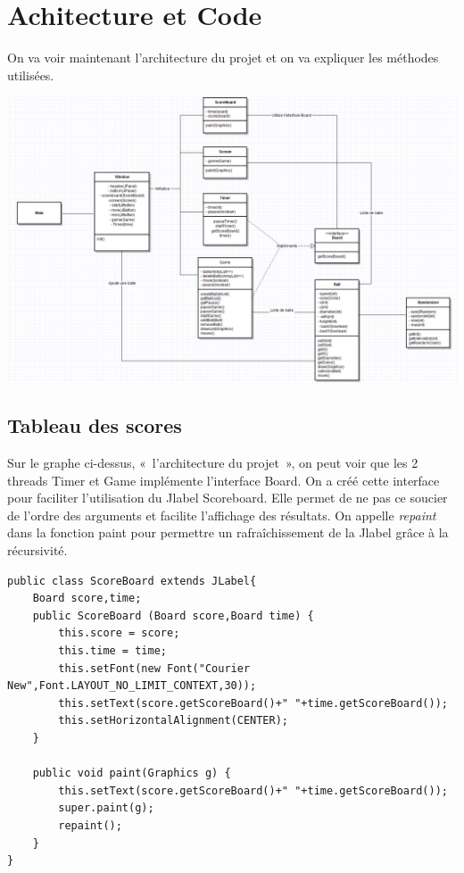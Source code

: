 \documentclass{article}
\begin{document}
\section{Achitecture et Code}
\label{section:hello} %

On va voir maintenant l'architecture du projet et on va expliquer les méthodes utilisées.

\begin{center}
  \includegraphics[scale=0.35]{architecture.png}
\end{center}

\subsection{Tableau des scores}
Sur le graphe ci-dessus, « l’architecture du projet », on peut voir que les 2 threads Timer et Game implémente l’interface Board. On a créé cette interface pour faciliter l’utilisation du Jlabel Scoreboard. Elle permet de ne pas ce soucier de l’ordre des arguments et facilite l’affichage des résultats. On appelle \textit{repaint}~\cite{repaintDoc} dans la fonction paint pour permettre un rafraîchissement de la Jlabel grâce à la récursivité. 
\begin{verbatim}
public class ScoreBoard extends JLabel{
    Board score,time;
    public ScoreBoard (Board score,Board time) {
        this.score = score;
        this.time = time;
        this.setFont(new Font("Courier New",Font.LAYOUT_NO_LIMIT_CONTEXT,30));
        this.setText(score.getScoreBoard()+" "+time.getScoreBoard());
        this.setHorizontalAlignment(CENTER);
    }
	
    public void paint(Graphics g) {
        this.setText(score.getScoreBoard()+" "+time.getScoreBoard());
        super.paint(g);
        repaint();
    }
}
\end{verbatim}
\end{document}

